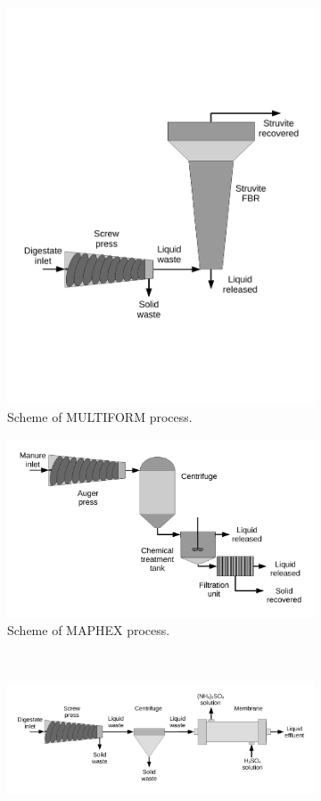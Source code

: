 \begin{refsection}[referencesCh6]
\begin{figure}
\begin{subfigure}{.5\textwidth}
	\centering
	\includegraphics[width=0.45\linewidth, trim={1cm 7.5cm 1cm 7cm},clip]{gfx/Chapter6/MULTIFORM.pdf} 
	\caption{Scheme of MULTIFORM process.}
	\label{fig:MULTIFORMscheme}
\end{subfigure}%
\begin{subfigure}{.5\textwidth}
	\centering
	\includegraphics[width=0.5\linewidth, trim={1cm 1cm 1cm 1cm},clip]{gfx/Chapter6/MAPHEX.pdf} 
	\caption{Scheme of MAPHEX process.}
	\label{fig:MAPHEXscheme}
\end{subfigure}
\\
\vspace{0.5cm}
\begin{subfigure}{.5\textwidth}
	\centering
	\includegraphics[width=0.8\linewidth, trim={1cm 1cm 1cm 1cm},clip]{gfx/Chapter6/Membrane2.pdf} 

\end{subfigure}
\end{figure}
\end{refsection}
